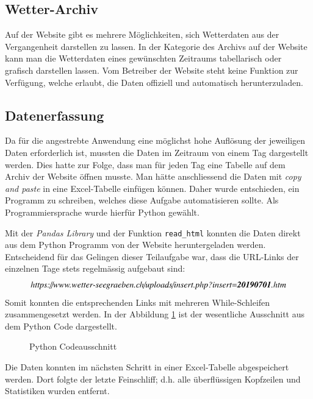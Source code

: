 \begin{refsection}
\subsection{Wetter-Archiv}
Auf der Website gibt es mehrere Möglichkeiten, sich Wetterdaten aus der Vergangenheit darstellen zu lassen.
In der Kategorie des Archivs auf der Website kann man die Wetterdaten eines gew\"unschten Zeitraums tabellarisch oder grafisch darstellen lassen.
Vom Betreiber der Website steht keine Funktion zur Verfügung, welche erlaubt, die Daten offiziell und automatisch herunterzuladen.
\subsection{Datenerfassung}
Da f\"ur die angestrebte Anwendung eine m\"oglichst hohe Aufl\"osung der jeweiligen Daten erforderlich ist, mussten die Daten im Zeitraum von einem Tag dargestellt werden.
Dies hatte zur Folge, dass man f\"ur jeden Tag eine Tabelle auf dem Archiv der Website \"offnen musste. Man hätte anschliessend die Daten mit \textit{copy and paste} in eine Excel-Tabelle einf\"ugen können. Daher wurde  entschieden, ein Programm zu schreiben, welches diese Aufgabe automatisieren sollte.
Als Programmiersprache wurde hierf\"ur Python gewählt.


Mit der \textit{Pandas Library} und der Funktion \texttt{read\_html} \space konnten die Daten direkt aus dem Python Programm von der Website heruntergeladen werden.
%
Entscheidend für das Gelingen dieser Teilaufgabe war, dass die URL-Links der einzelnen Tage stets regelmässig aufgebaut sind:
$$\centering{\textit{https://www.wetter-seegraeben.ch/uploads/insert.php?insert=\textbf{20190701}.htm}}$$
Somit konnten die entsprechenden Links mit mehreren While-Schleifen zusammengesetzt werden.
In der Abbildung \ref{fig:python-code} ist der wesentliche Ausschnitt aus dem Python Code dargestellt.
\begin{figure}
	\centering
	
	\caption{Python Codeausschnitt}
	\label{fig:python-code}
\end{figure}
Die Daten konnten im nächsten Schritt in einer Excel-Tabelle abgespeichert werden.
Dort folgte der letzte Feinschliff; d.h. alle überflüssigen Kopfzeilen und Statistiken wurden entfernt.


\end{refsection}

